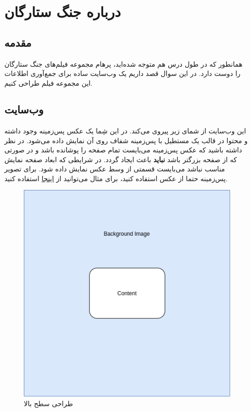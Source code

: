 \documentclass[../main.tex]{subfiles}
\begin{document}
\section{درباره جنگ ستارگان}

\subsection{مقدمه}
\paragraph{}
همانطور که در طول درس هم متوجه شده‌اید، پرهام مجموعه فیلم‌های جنگ ستارگان را دوست دارد.
در این سوال قصد داریم یک وب‌سایت ساده برای جمع‌آوری اطلاعات این مجموعه فیلم طراحی کنیم.

\subsection{وب‌سایت}
\paragraph{}
این وب‌سایت از شمای زیر پیروی می‌کند. در این شِما یک عکس پس‌زمینه وجود داشته و محتوا در قالب یک مستطیل با پس‌زمینه شفاف روی آن نمایش داده می‌شود.
در نظر داشته باشید که عکس پس‌زمینه می‌بایست تمام صفحه را پوشانده باشد و در صورتی که از صفحه بزرگتر باشد \textbf{نباید} باعث ایجاد  گردد.
در شرایطی که ابعاد صفحه نمایش مناسب نباشد می‌بایست قسمتی از وسط عکس نمایش داده شود.
برای تصویر پس‌زمینه حتما از عکس استفاده کنید، برای مثال می‌توانید از \href{https://unsplash.com/s/photos/starwars}{اینجا} استفاده کنید.

\begin{figure}[h]
  \centering
  \includegraphics[scale=0.25]{./swapi-top-level}
  \caption{طراحی سطح بالا}
\end{figure}
\end{document}
